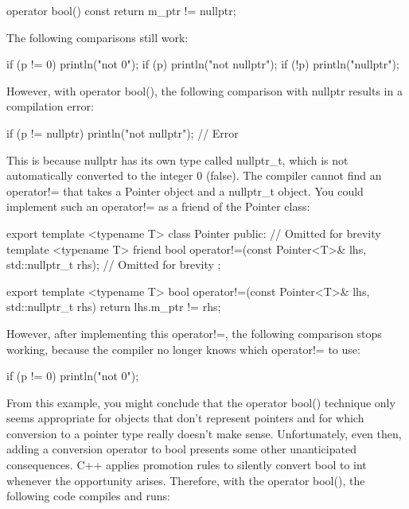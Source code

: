 \begin{cpp}
operator bool() const { return m_ptr != nullptr; }
\end{cpp}

The following comparisons still work:

\begin{cpp}
if (p != 0) { println("not 0"); }
if (p)      { println("not nullptr"); }
if (!p)     { println("nullptr"); }
\end{cpp}

However, with operator bool(), the following comparison with nullptr results in a compilation error:

\begin{cpp}
if (p != nullptr) { println("not nullptr"); } // Error
\end{cpp}

This is because nullptr has its own type called nullptr\_t, which is not automatically converted to the integer 0 (false). The compiler cannot find an operator!= that takes a Pointer object and a nullptr\_t object. You could implement such an operator!= as a friend of the Pointer class:

\begin{cpp}
export template <typename T>
class Pointer
{
    public:
        // Omitted for brevity
        template <typename T>
        friend bool operator!=(const Pointer<T>& lhs, std::nullptr_t rhs);
        // Omitted for brevity
};

export template <typename T>
bool operator!=(const Pointer<T>& lhs, std::nullptr_t rhs)
{
    return lhs.m_ptr != rhs;
}
\end{cpp}

However, after implementing this operator!=, the following comparison stops working, because the compiler no longer knows which operator!= to use:

\begin{cpp}
if (p != 0) { println("not 0"); }
\end{cpp}

From this example, you might conclude that the operator bool() technique only seems appropriate for objects that don’t represent pointers and for which conversion to a pointer type really doesn’t make sense. Unfortunately, even then, adding a conversion operator to bool presents some other unanticipated consequences. C++ applies promotion rules to silently convert bool to int whenever the opportunity arises. Therefore, with the operator bool(), the following code compiles and runs:

